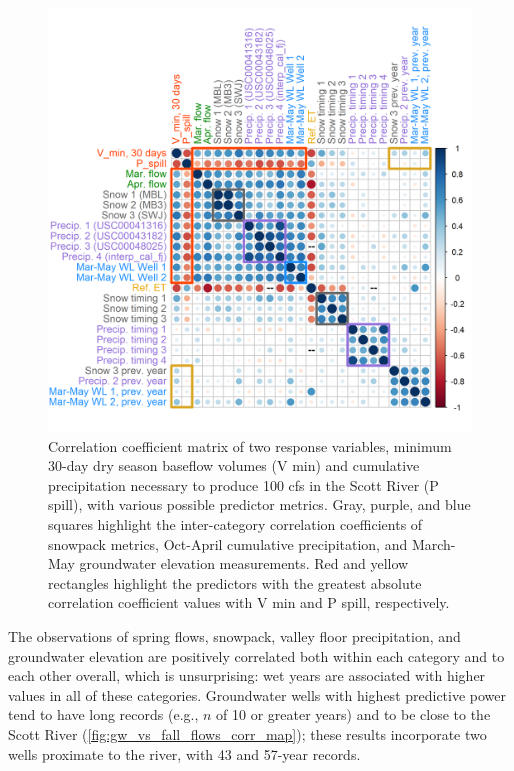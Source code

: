 \documentclass[
]{article}
\begin{document}
\begin{figure}
\includegraphics[width=1\linewidth]{f08} \caption{\label{fig:corr_matrix} Correlation coefficient matrix of two response variables, minimum 30-day dry season baseflow volumes (V min) and cumulative precipitation necessary to produce 100 cfs in the Scott River (P spill), with various possible predictor metrics. Gray, purple, and blue squares highlight the inter-category correlation coefficients of snowpack metrics, Oct-April cumulative precipitation, and March-May groundwater elevation measurements. Red and yellow rectangles highlight the predictors with the greatest absolute correlation coefficient values with V min and P spill, respectively.}\label{fig:corr_matrix}
\end{figure}

The observations of spring flows, snowpack, valley floor precipitation,
and groundwater elevation are positively correlated both within each
category and to each other overall, which is unsurprising: wet years are
associated with higher values in all of these categories. Groundwater
wells with highest predictive power tend to have long records (e.g.,
\(n\) of 10 or greater years) and to be close to the Scott River
(\autoref{fig:gw_vs_fall_flows_corr_map}); these results incorporate two
wells proximate to the river, with 43 and 57-year records.
\end{document}
